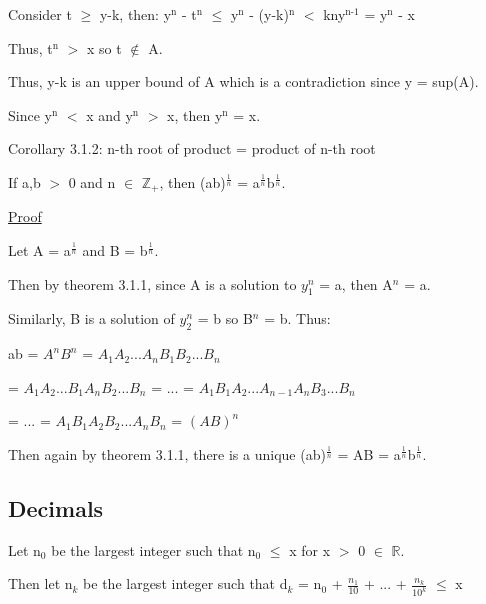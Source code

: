 	\qquad Consider t $ \geq $  y-k, then:
	y$^\text{n}$ - t$^\text{n}$ $ \leq $  y$^\text{n}$ - (y-k)$^\text{n}$ $<$
	kny$^\text{n-1}$ = y$^\text{n}$ - x

	\qquad Thus, t$^\text{n}$ $>$ x so t $\not \in$ A.

	\qquad Thus, y-k is an upper bound of A which is a contradiction since y = sup(A).

	Since y$^\text{n}$ $<$ x and y$^\text{n}$ $>$ x, then y$^\text{n}$ = x. 

\newpage

{ \color{orange} Corollary 3.1.2: n-th root of product = product of n-th root} 

	\begin{adjustbox}{minipage=14cm, right}
		If a,b $>$ 0 and n $\in$ $\mathbb{Z}_+$, then
		(ab)$^{\frac{1}{n}}$ = a$^{\frac{1}{n}}$b$^{\frac{1}{n}}$.  
	\end{adjustbox}

{ \color{magenta} \underline{Proof} } 

	Let A = a$^{\frac{1}{n}}$ and B = b$^{\frac{1}{n}}$.

	Then by {\color{red} theorem 3.1.1}, since A is a solution to $y_1^n$ = a, then A$^n$ = a.

	Similarly, B is a solution of $y_2^n$ = b so B$^n$ = b. Thus:

	\hspace{1cm} ab = $A^n$$B^n$ = $A_1A_2...A_nB_1B_2...B_n$

	\hspace{1.6cm} = $A_1A_2...B_1A_nB_2...B_n$ = ... = $A_1B_1A_2...A_{n-1}A_nB_3...B_n$

	\hspace{1.6cm} = ... = $A_1B_1A_2B_2...A_nB_n$ = $(AB)^n$

	Then again by {\color{red} theorem 3.1.1}, there is a unique
	(ab)$^{\frac{1}{n}}$ = AB = a$^{\frac{1}{n}}$b$^{\frac{1}{n}}$.




	
\subsection{Decimals}

	Let n$_0$ be the largest integer such that n$_0$ $\leq$ x for x $>$ 0 $\in$ $\mathbb{R}$.

	Then let n$_k$ be the largest integer such that
	d$_k$ = n$_0$ + $\frac{n_1}{10}$ + ... + $\frac{n_k}{10^k}$ $\leq$ x

